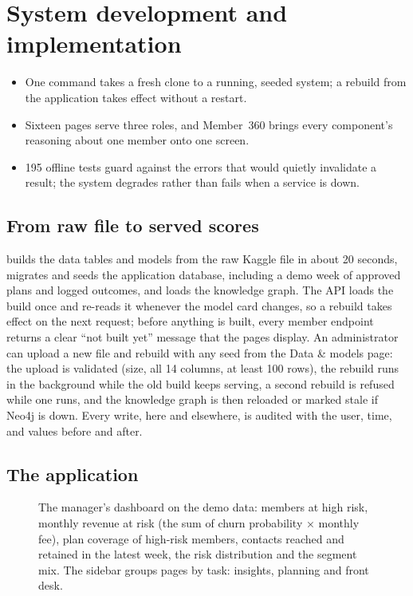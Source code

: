 \chapter{System development and implementation}
\label{ch:implementation}

\begin{inbrief}
\begin{itemize}
  \item One command takes a fresh clone to a running, seeded system; a rebuild from the application takes effect without a restart.
  \item Sixteen pages serve three roles, and Member~360 brings every component's reasoning about one member onto one screen.
  \item 195 offline tests guard against the errors that would quietly invalidate a result; the system degrades rather than fails when a service is down.
\end{itemize}
\end{inbrief}

\section{From raw file to served scores}

 builds the data tables and models from the raw Kaggle file in about 20 seconds, migrates and seeds the application database, including a demo week of approved plans and logged outcomes, and loads the knowledge graph. The API loads the build once and re-reads it whenever the model card changes, so a rebuild takes effect on the next request; before anything is built, every member endpoint returns a clear \enquote{not built yet} message that the pages display. An administrator can upload a new file and rebuild with any seed from the Data \& models page: the upload is validated (size, all 14 columns, at least 100 rows), the rebuild runs in the background while the old build keeps serving, a second rebuild is refused while one runs, and the knowledge graph is then reloaded or marked stale if Neo4j is down. Every write, here and elsewhere, is audited with the user, time, and values before and after.

\section{The application}

\begin{figure}[tb]
  \centering
  \caption{The manager's dashboard on the demo data: members at high risk, monthly revenue at risk (the sum of churn probability × monthly fee), plan coverage of high-risk members, contacts reached and retained in the latest week, the risk distribution and the segment mix. The sidebar groups pages by task: insights, planning and front desk.}
  \label{fig:dashboard}
\end{figure}

